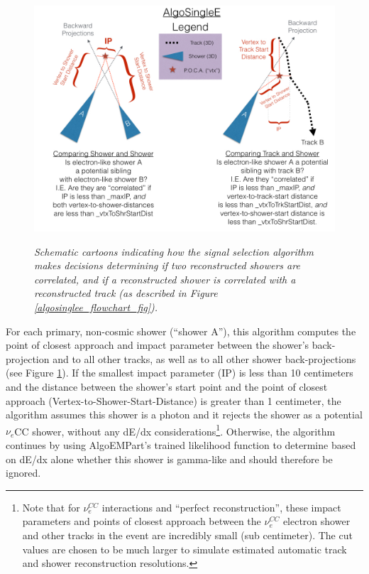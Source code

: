 \begin{figure}[ht!]
\centering
\includegraphics[width=150mm]{Figures/algosinglee_cartoon.png}\\
\caption{\textit{Schematic cartoons indicating how the signal selection algorithm makes decisions determining if two reconstructed showers are correlated, and if a reconstructed shower is correlated with a reconstructed track (as described in Figure \ref{algosinglee_flowchart_fig}).}}
\label{algosinglee_cartoon_fig}
\end{figure}

For each primary, non-cosmic shower (``shower A''), this algorithm computes the point of closest approach and impact parameter between the shower's back-projection and to all other tracks, as well as to all other shower back-projections (see Figure \ref{algosinglee_cartoon_fig}). If the smallest impact parameter (IP) is less than 10 centimeters and the distance between the shower's start point and the point of closest approach (Vertex-to-Shower-Start-Distance) is greater than 1 centimeter, the algorithm assumes this shower is a photon and it rejects the shower as a potential $\nu_e$CC shower, without any dE/dx considerations\footnote{Note that for $\nu_e^{CC}$ interactions and ``perfect reconstruction'', these impact parameters and points of closest approach between the $\nu_e^{CC}$ electron shower and other tracks in the event are incredibly small (sub centimeter). The cut values are chosen to be much larger to simulate estimated automatic track and shower reconstruction resolutions.}. Otherwise, the algorithm continues by using AlgoEMPart's trained likelihood function to determine based on dE/dx alone whether this shower is gamma-like and should therefore be ignored.\\

